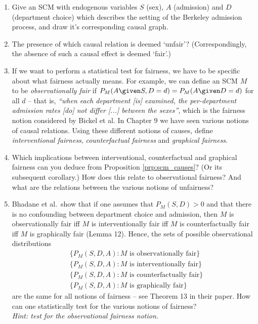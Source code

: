 \begin{enumerate}[label=14.\arabic*]
	\begin{enumerate}
		\item Give an SCM with endogenous variables $S$ (sex), $A$ (admission) and $D$ (department choice) which describes the setting of the Berkeley admission process, and draw it's corresponding causal graph.
		\item The presence of which causal relation is deemed `unfair'? (Correspondingly, the absence of such a causal effect is deemed `fair'.)
		\item If we want to perform a statistical test for fairness, we have to be specific about what fairness actually means. For example, we can define an SCM $M$ to be \emph{observationally fair} if $P_M(A \given S, D=d) = P_M(A\given D=d)$ for all $d$ -- that is, \emph{``when each department [is] examined, the per-department admission rates [do] not differ [...] between the sexes''}, which is the fairness notion considered by Bickel et al. In Chapter 9 we have seen various notions of causal relations. Using these different notions of causes, define \emph{interventional fairness}, \emph{counterfactual fairness} and \emph{graphical fairness}.
		\item Which implications between interventional, counterfactual and graphical fairness can you deduce from Proposition \ref*{prp:scm_causes}? (Or its subsequent corollary.) How does this relate to observational fairness? And what are the relations between the various notions of unfairness?
		\item\label{q:ci_test} Bhadane et al.\ show that if one assumes that $P_M(S,D) > 0$ and that there is no confounding between department choice and admission, then $M$ is observationally fair iff $M$ is interventionally fair iff $M$ is counterfactually fair iff $M$ is graphically fair (Lemma 12). Hence, the sets of possible observational distributions
		\begin{align*}
			 & \{P_M(S, D, A) : M \textrm{ is observationally fair}\}  \\
			 & \{P_M(S, D, A) : M \textrm{ is interventionally fair}\} \\
			 & \{P_M(S, D, A) : M \textrm{ is counterfactually fair}\} \\
			 & \{P_M(S, D, A) : M \textrm{ is graphically fair}\}
		\end{align*}
		are the same for all notions of fairness -- see Theorem 13 in their paper. How can one statistically test for the various notions of fairness?\\
		\emph{Hint: test for the observational fairness notion.}

\end{enumerate}
\end{enumerate}
